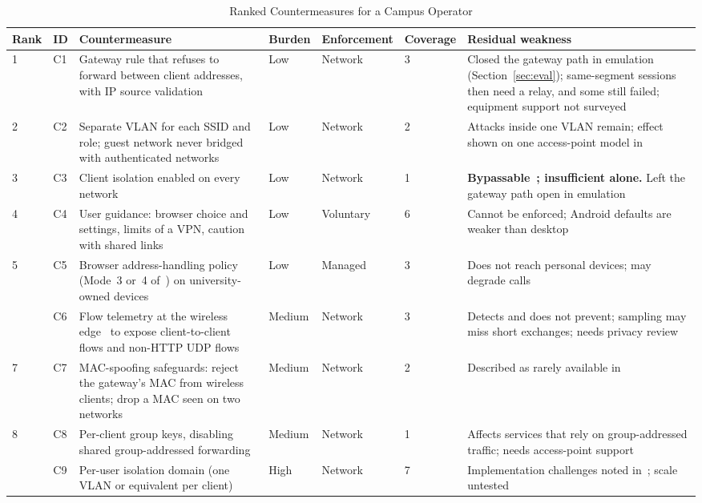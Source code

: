 \documentclass[conference]{IEEEtran}
\begin{document}
\begin{table}[t]
\caption{Ranked Countermeasures for a Campus Operator}
\label{tab:cm}
\centering
\footnotesize
\begin{tabularx}{\textwidth}{@{}L{0.55cm}L{0.5cm}L{4.2cm}L{1.0cm}L{1.5cm}L{1.15cm}Y@{}}
\toprule
\textbf{Rank} & \textbf{ID} & \textbf{Countermeasure} & \textbf{Burden} & \textbf{Enforcement} & \textbf{Coverage} & \textbf{Residual weakness} \\
 & C1 & Gateway rule that refuses to forward between client addresses, with IP source validation & Low & Network & 3 & Closed the gateway path in emulation (Section~\ref{sec:eval}); same-segment sessions then need a relay, and some still failed; equipment support not surveyed \\
2 & C2 & Separate VLAN for each SSID and role; guest network never bridged with authenticated networks & Low & Network & 2 & Attacks inside one VLAN remain; effect shown on one access-point model in~\cite{airsnitch2026} \\
3 & C3 & Client isolation enabled on every network & Low & Network & 1 & \textbf{Bypassable~\cite{framingframes2023,airsnitch2026}; insufficient alone.} Left the gateway path open in emulation \\
4 & C4 & User guidance: browser choice and settings, limits of a VPN, caution with shared links & Low & Voluntary & 6 & Cannot be enforced; Android defaults are weaker than desktop~\cite{koysha2025} \\
5 & C5 & Browser address-handling policy (Mode~3 or~4 of~\cite{rfc8828}) on university-owned devices & Low & Managed & 3 & Does not reach personal devices; may degrade calls \\
 & C6 & Flow telemetry at the wireless edge~\cite{rfc3176,rfc5477} to expose client-to-client flows and non-HTTP UDP flows & Medium & Network & 3 & Detects and does not prevent; sampling may miss short exchanges; needs privacy review \\
7 & C7 & MAC-spoofing safeguards: reject the gateway's MAC from wireless clients; drop a MAC seen on two networks & Medium & Network & 2 & Described as rarely available in~\cite{airsnitch2026} \\
8 & C8 & Per-client group keys, disabling shared group-addressed forwarding & Medium & Network & 1 & Affects services that rely on group-addressed traffic; needs access-point support \\
 & C9 & Per-user isolation domain (one VLAN or equivalent per client) & High & Network & 7 & Implementation challenges noted in~\cite{airsnitch2026}; scale untested \\

\end{tabularx}
\end{table}
\end{document}
